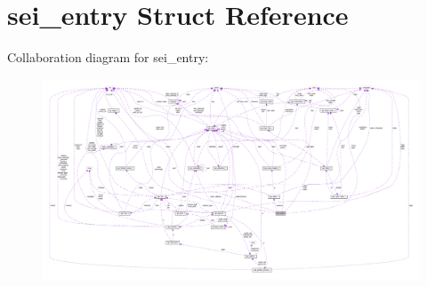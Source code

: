 \hypertarget{structsei__entry}{}\section{sei\+\_\+entry Struct Reference}
\label{structsei__entry}


Collaboration diagram for sei\+\_\+entry\+:
\nopagebreak
\begin{figure}[H]
\begin{center}
\leavevmode
\includegraphics[width=350pt]{structsei__entry__coll__graph}
\end{center}
\end{figure}
